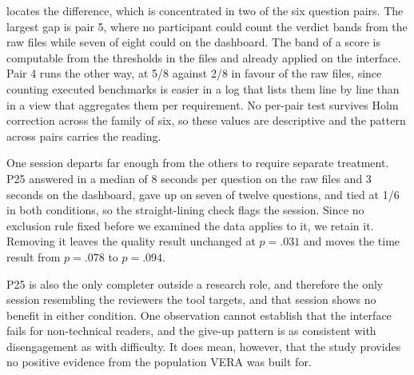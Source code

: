 \documentclass[10pt,conference]{IEEEtran}
\begin{document}
 locates the difference, which is concentrated in two of the six question pairs.
The largest gap is pair 5, where no participant could count the verdict bands from the raw files while seven of eight could on the dashboard.
The band of a score is computable from the thresholds in the files and already applied on the interface.
Pair 4 runs the other way, at 5/8 against 2/8 in favour of the raw files, since counting executed benchmarks is easier in a log that lists them line by line than in a view that aggregates them per requirement.
No per-pair test survives Holm correction across the family of six, so these values are descriptive and the pattern across pairs carries the reading.

One session departs far enough from the others to require separate treatment.
P25 answered in a median of 8 seconds per question on the raw files and 3 seconds on the dashboard, gave up on seven of twelve questions, and tied at 1/6 in both conditions, so the straight-lining check flags the session.
Since no exclusion rule fixed before we examined the data applies to it, we retain it.
Removing it leaves the quality result unchanged at $p = .031$ and moves the time result from $p = .078$ to $p = .094$.

P25 is also the only completer outside a research role, and therefore the only session resembling the reviewers the tool targets, and that session shows no benefit in either condition.
One observation cannot establish that the interface fails for non-technical readers, and the give-up pattern is as consistent with disengagement as with difficulty.
It does mean, however, that the study provides no positive evidence from the population VERA was built for.
\end{document}
